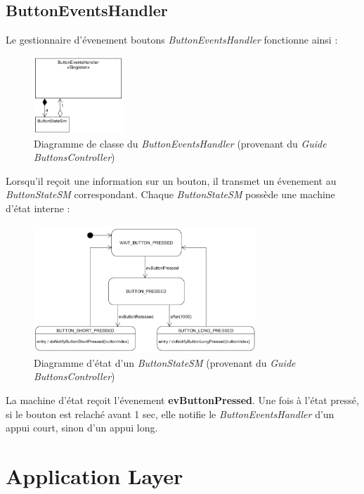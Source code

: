 \subsection{ButtonEventsHandler}
Le gestionnaire d'évenement boutons \emph{ButtonEventsHandler} fonctionne ainsi :
\begin{figure}[H]
    \centering
    \includegraphics[width=0.3\textwidth]{Images/buttons/btnEvHandler.PNG}
    \caption[Full UML]{Diagramme de classe du \emph{ButtonEventsHandler}
    (provenant du \emph{Guide ButtonsController}\footnotemark[1])}
\end{figure}
Lorsqu'il reçoit une information sur un bouton, il transmet un évenement
au \emph{ButtonStateSM} correspondant. Chaque \emph{ButtonStateSM} possède
une machine d'état interne :
\begin{figure}[H]
    \centering
    \includegraphics[width=0.75\textwidth]{Images/buttons/btnSM.PNG}
    \caption[Full UML]{Diagramme d'état d'un \emph{ButtonStateSM}
    (provenant du \emph{Guide ButtonsController}\footnotemark[1])}
\end{figure}
La machine d'état reçoit l'évenement \textbf{evButtonPressed}.
Une fois à l'état pressé, si le bouton est relaché avant 1 sec, elle notifie
le \emph{ButtonEventsHandler} d'un appui court, sinon d'un appui long.\newpage

\section{Application Layer}
